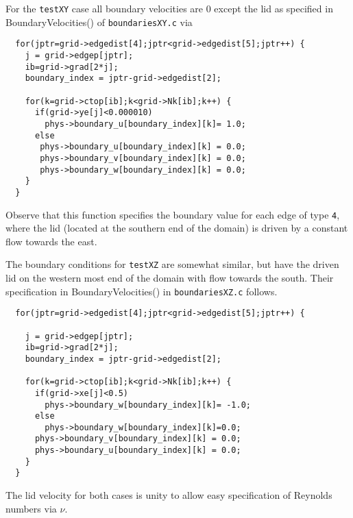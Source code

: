 For the \verb+testXY+ case all boundary velocities are 0 except the lid
as specified in BoundaryVelocities() of \verb+boundariesXY.c+ via
\begin{verbatim}
  for(jptr=grid->edgedist[4];jptr<grid->edgedist[5];jptr++) {
    j = grid->edgep[jptr];
    ib=grid->grad[2*j];
    boundary_index = jptr-grid->edgedist[2];

    for(k=grid->ctop[ib];k<grid->Nk[ib];k++) {
      if(grid->ye[j]<0.000010)
        phys->boundary_u[boundary_index][k]= 1.0;
      else
       phys->boundary_u[boundary_index][k] = 0.0;
       phys->boundary_v[boundary_index][k] = 0.0;
       phys->boundary_w[boundary_index][k] = 0.0;
    }
  }
\end{verbatim}
Observe that this function specifies the boundary value for each
edge of type \verb+4+, where the lid (located at the southern end of
the domain) is driven by a constant flow towards the east.   

The boundary conditions for \verb+testXZ+ are somewhat similar, but have the
driven lid on the western most end of the domain with flow towards the 
south.  Their specification in BoundaryVelocities() in \verb+boundariesXZ.c+
follows.
\begin{verbatim}
  for(jptr=grid->edgedist[4];jptr<grid->edgedist[5];jptr++) {

    j = grid->edgep[jptr];
    ib=grid->grad[2*j];
    boundary_index = jptr-grid->edgedist[2];

    for(k=grid->ctop[ib];k<grid->Nk[ib];k++) {
      if(grid->xe[j]<0.5)
        phys->boundary_w[boundary_index][k]= -1.0;
      else
        phys->boundary_w[boundary_index][k]=0.0;
      phys->boundary_v[boundary_index][k] = 0.0;
      phys->boundary_u[boundary_index][k] = 0.0;
    }
  }
\end{verbatim}
The lid velocity for both cases is unity to allow easy specification of 
Reynolds numbers via $\nu$. 


